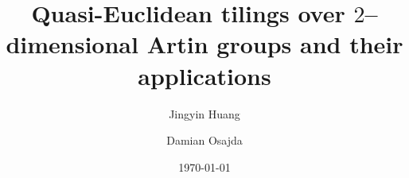 \documentclass[11pt]{amsart}
\theoremstyle{definition}
\begin{document}
\title[
Quasi-Euclidean tilings and their applications
]{
Quasi-Euclidean tilings over $2$--dimensional Artin groups and their applications
}

\author{Jingyin Huang}
\address{Max Planck Institute for Mathematics, Vivatsgasse 7, 53111 Bonn, Germany}


\author{Damian Osajda}
\address{Instytut Matematyczny,
Uniwersytet Wroc\l awski\\
pl.\ Grun\-wal\-dzki 2/4,
50--384 Wroc{\l}aw, Poland}
\address{Institute of Mathematics, Polish Academy of Sciences\\
\'Sniadeckich 8, 00-656 War\-sza\-wa, Poland}

 


\date{\today}
\end{document}

